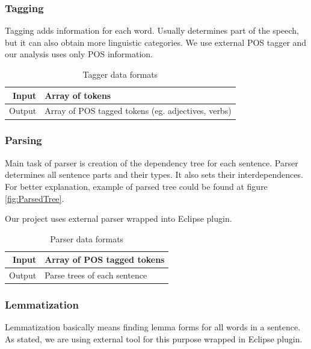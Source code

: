     


\subsubsection{Tagging}
Tagging adds information for each word. Usually determines part of the speech, but it can also obtain more linguistic categories. We use external POS tagger and our analysis uses only POS information.

\begin{table}[ht]   %
\begin{center}
  \begin{tabular}{| r | l |}
\hline
Input 	& Array of tokens \\ \hline
Output 	& Array of POS tagged tokens (eg. adjectives, verbs) \\ 
\hline
  \end{tabular}
  \caption{Tagger data formats}
  \label{tab.tagging}
\end{center}
\end{table} 


\subsubsection{Parsing}
Main task of parser is creation of the dependency tree for each sentence. Parser determines all sentence parts and their types. It also sets their interdependences. For better explanation, example of parsed tree could be found at figure \ref{fig:ParsedTree}.

Our project uses external parser wrapped into Eclipse plugin. 


\begin{table}[ht]   %
\begin{center}
  \begin{tabular}{| r | l |}
\hline
Input 	& Array of POS tagged tokens \\ \hline
Output 	& Parse trees of each sentence \\ 
\hline
  \end{tabular}
  \caption{Parser data formats}
  \label{tab.parsing}
\end{center}
\end{table} 



\subsubsection{Lemmatization}
Lemmatization basically means finding lemma forms for all words in a sentence. As stated, we are using external tool for this purpose wrapped in Eclipse plugin.

